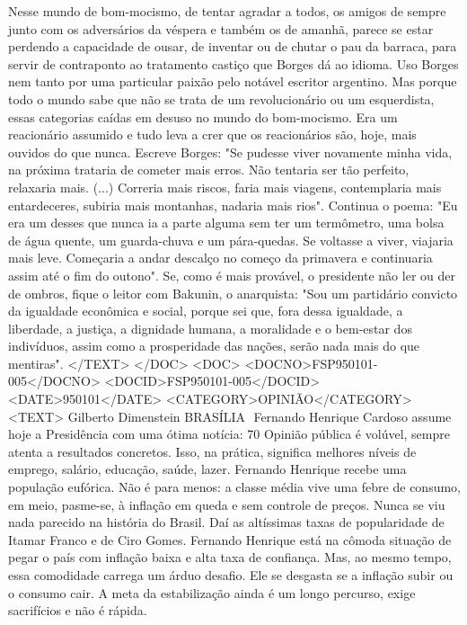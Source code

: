 Nesse mundo de bom-mocismo, de tentar agradar a todos, os amigos de sempre junto com os adversários da véspera e também os de amanhã, parece se estar perdendo a capacidade de ousar, de inventar ou de chutar o pau da barraca, para servir de contraponto ao tratamento castiço que Borges dá ao idioma.
Uso Borges nem tanto por uma particular paixão pelo notável escritor argentino. Mas porque todo o mundo sabe que não se trata de um revolucionário ou um esquerdista, essas categorias caídas em desuso no mundo do bom-mocismo. Era um reacionário assumido e tudo leva a crer que os reacionários são, hoje, mais ouvidos do que nunca.
Escreve Borges: "Se pudesse viver novamente minha vida, na próxima trataria de cometer mais erros. Não tentaria ser tão perfeito, relaxaria mais. (...) Correria mais riscos, faria mais viagens, contemplaria mais entardeceres, subiria mais montanhas, nadaria mais rios".
Continua o poema: "Eu era um desses que nunca ia a parte alguma sem ter um termômetro, uma bolsa de água quente, um guarda-chuva e um pára-quedas. Se voltasse a viver, viajaria mais leve. Começaria a andar descalço no começo da primavera e continuaria assim até o fim do outono".
Se, como é mais provável, o presidente não ler ou der de ombros, fique o leitor com Bakunin, o anarquista: "Sou um partidário convicto da igualdade econômica e social, porque sei que, fora dessa igualdade, a liberdade, a justiça, a dignidade humana, a moralidade e o bem-estar dos indivíduos, assim como a prosperidade das nações, serão nada mais do que mentiras".
</TEXT>
</DOC>
<DOC>
<DOCNO>FSP950101-005</DOCNO>
<DOCID>FSP950101-005</DOCID>
<DATE>950101</DATE>
<CATEGORY>OPINIÃO</CATEGORY>
<TEXT>
Gilberto Dimenstein 
BRASÍLIA  Fernando Henrique Cardoso assume hoje a Presidência com uma ótima notícia: 70%
Opinião pública é volúvel, sempre atenta a resultados concretos. Isso, na prática, significa melhores níveis de emprego, salário, educação, saúde, lazer. Fernando Henrique recebe uma população eufórica.
Não é para menos: a classe média vive uma febre de consumo, em meio, pasme-se, à inflação em queda e sem controle de preços. Nunca se viu nada parecido na história do Brasil. Daí as altíssimas taxas de popularidade de Itamar Franco e de Ciro Gomes.
Fernando Henrique está na cômoda situação de pegar o país com inflação baixa e alta taxa de confiança. Mas, ao mesmo tempo, essa comodidade carrega um árduo desafio. Ele se desgasta se a inflação subir ou o consumo cair. A meta da estabilização ainda é um longo percurso, exige sacrifícios e não é rápida.
